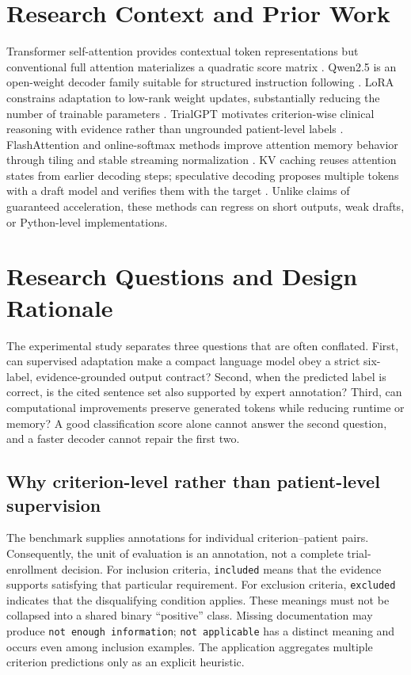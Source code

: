 \documentclass[conference]{IEEEtran}
\begin{document}
\section{Research Context and Prior Work}
Transformer self-attention provides contextual token representations but conventional full attention materializes a quadratic score matrix \cite{attention}. Qwen2.5 is an open-weight decoder family suitable for structured instruction following \cite{qwen}. LoRA constrains adaptation to low-rank weight updates, substantially reducing the number of trainable parameters \cite{lora}. TrialGPT motivates criterion-wise clinical reasoning with evidence rather than ungrounded patient-level labels \cite{trialgpt}. FlashAttention and online-softmax methods improve attention memory behavior through tiling and stable streaming normalization \cite{flash,online}. KV caching reuses attention states from earlier decoding steps; speculative decoding proposes multiple tokens with a draft model and verifies them with the target \cite{speculative}. Unlike claims of guaranteed acceleration, these methods can regress on short outputs, weak drafts, or Python-level implementations.

\section{Research Questions and Design Rationale}
The experimental study separates three questions that are often conflated. First, can supervised adaptation make a compact language model obey a strict six-label, evidence-grounded output contract? Second, when the predicted label is correct, is the cited sentence set also supported by expert annotation? Third, can computational improvements preserve generated tokens while reducing runtime or memory? A good classification score alone cannot answer the second question, and a faster decoder cannot repair the first two.

\subsection{Why criterion-level rather than patient-level supervision}
The benchmark supplies annotations for individual criterion--patient pairs. Consequently, the unit of evaluation is an annotation, not a complete trial-enrollment decision. For inclusion criteria, \texttt{included} means that the evidence supports satisfying that particular requirement. For exclusion criteria, \texttt{excluded} indicates that the disqualifying condition applies. These meanings must not be collapsed into a shared binary ``positive'' class. Missing documentation may produce \texttt{not enough information}; \texttt{not applicable} has a distinct meaning and occurs even among inclusion examples. The application aggregates multiple criterion predictions only as an explicit heuristic.
\end{document}
